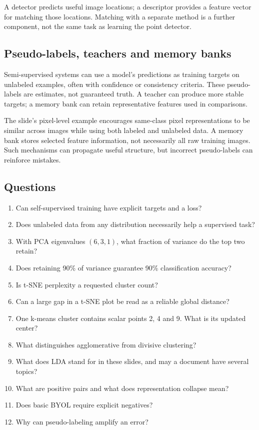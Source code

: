 \documentclass[11pt]{article}
\begin{document}
A detector predicts useful image locations; a descriptor provides a feature vector for matching those locations. Matching with a separate method is a further component, not the same task as learning the point detector.

\subsection{Pseudo-labels, teachers and memory banks}
Semi-supervised systems can use a model's predictions as training targets on unlabeled examples, often with confidence or consistency criteria. These pseudo-labels are estimates, not guaranteed truth. A teacher can produce more stable targets; a memory bank can retain representative features used in comparisons.

The slide's pixel-level example encourages same-class pixel representations to be similar across images while using both labeled and unlabeled data. A memory bank stores selected feature information, not necessarily all raw training images. Such mechanisms can propagate useful structure, but incorrect pseudo-labels can reinforce mistakes.

\subsection{Questions}
\begin{enumerate}
\item Can self-supervised training have explicit targets and a loss?
\item Does unlabeled data from any distribution necessarily help a supervised task?
\item With PCA eigenvalues $(6,3,1)$, what fraction of variance do the top two retain?
\item Does retaining 90\% of variance guarantee 90\% classification accuracy?
\item Is t-SNE perplexity a requested cluster count?
\item Can a large gap in a t-SNE plot be read as a reliable global distance?
\item One k-means cluster contains scalar points 2, 4 and 9. What is its updated center?
\item What distinguishes agglomerative from divisive clustering?
\item What does LDA stand for in these slides, and may a document have several topics?
\item What are positive pairs and what does representation collapse mean?
\item Does basic BYOL require explicit negatives?
\item Why can pseudo-labeling amplify an error?
\end{enumerate}
\end{document}
